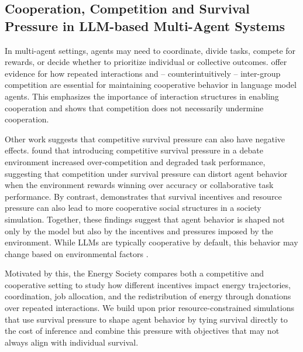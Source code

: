 \documentclass[sigconf,nonacm]{acmart}
\begin{document}
\subsection{Cooperation, Competition and Survival Pressure in LLM-based Multi-Agent Systems}

In multi-agent settings, agents may need to coordinate, divide tasks, compete for rewards, or decide whether to prioritize individual or collective outcomes.
\citet{tonini2025super} offer evidence for how repeated interactions and -- counterintuitively -- inter-group competition are essential for maintaining cooperative behavior in language model agents. This emphasizes the importance of interaction structures in enabling cooperation and shows that competition does not necessarily undermine cooperation.

Other work suggests that competitive survival pressure can also have negative effects. \citet{ma2025hungergamedebateemergence} found that introducing competitive survival pressure in a debate environment increased over-competition and degraded task performance, suggesting that competition under survival pressure can distort agent behavior when the environment rewards winning over accuracy or collaborative task performance.
By contrast, \citet{dai2024artificialleviathanexploringsocial} demonstrates that survival incentives and resource pressure can also lead to more cooperative social structures in a society simulation.
Together, these findings suggest that agent behavior is shaped not only by the model but also by the incentives and pressures imposed by the environment. While LLMs are typically cooperative by default, this behavior may change based on environmental factors \cite{fontana2024nicerhumanslargelanguage, meinke2025frontiermodelscapableincontext, tonini2025super}.

Motivated by this, the Energy Society compares both a competitive and cooperative setting to study how different incentives
impact energy trajectories, coordination, job allocation, and the redistribution of energy through donations over repeated interactions.
We build upon prior resource-constrained simulations that use survival pressure to shape agent behavior by tying survival directly to the cost of inference and combine this pressure with objectives that may not always align with individual survival.
\end{document}
